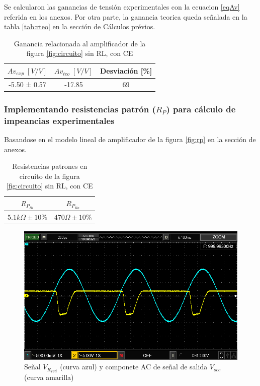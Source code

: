 \documentclass[12pt, a4paper]{article}
\begin{document}
    \newpage

    Se calcularon las ganancias de tensión experimentales con la ecuacion \eqref{eqAv} referida en los anexos. Por otra parte, la ganancia teorica queda señalada en la tabla \ref{tab:rteo} en la sección de Cálculos prévios.

    \begin{table}[h!]
        \centering
        \caption{Ganancia relacionada al amplificador de la figura \ref{fig:circuito} sin RL, con CE}
        \label{tab:av3}
        \begin{tabular}{|c|c|c|} \hline
            $Av_{exp} \; [V/V]$  &  $Av_{teo} \; [V/V]$  & Desviación [\%] \\ \hline
            -5.50 ± 0.57         &       -17.85          & 69   \\ \hline
        \end{tabular}
    \end{table}

    \subsubsection{Implementando resistencias patrón ($R_P$) para cálculo de impeancias experimentales}

    Basandose en el modelo lineal de amplificador de la figura \ref{fig:rp} en la sección de anexos.

    \begin{table}[h!]
        \centering
        \caption{Resistencias patrones en circuito de la figura \ref{fig:circuito} sin RL, con CE}
        \label{tab:rp3}
        \begin{tabular}{|c|c|} \hline
            $R_{P_{Ri}}$          &  $R_{P_{Ro}}$  \\ \hline
            $5.1k\Omega \pm 10\%$  &  $470\Omega \pm 10\%$    \\ \hline
        \end{tabular}
    \end{table}

    \begin{figure}[h!]
        \centering
        \includegraphics[height=5cm\textwidth]{RPsRLcCE.png}
        \caption{Señal $V_{R_{PRi}}$ (curva azul) y componete AC de señal de salida $V_{occ}$ (curva amarilla)}
        \label{fig:vrp3}
    \end{figure}
\end{document}
